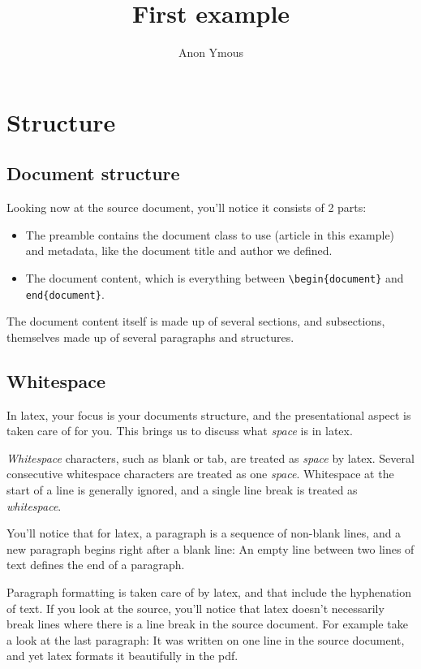 \documentclass{article}
\title{First example}
\author{Anon Ymous}
\begin{document}
\maketitle

\section{Structure}

\subsection{Document structure}

Looking now at the source document, you'll notice it consists of 2 parts:

\begin{itemize}
    \item The preamble contains the document class to use (article in this
    example) and metadata, like the document title and author we defined.
    \item The document content, which is everything between
    \verb`\begin{document}` and \verb`end{document}`.
\end{itemize}

The document content itself is made up of several sections, and subsections,
themselves made up of several paragraphs and structures.


\subsection{Whitespace}

In latex, your focus is your documents structure, and the presentational aspect
is taken care of for you. This brings us to discuss what \textit{space} is in
latex.

\textit{Whitespace} characters, such as blank or tab, are treated as
\textit{space} by latex.
Several consecutive whitespace characters are treated as one \textit{space}.
Whitespace at the start of a line is generally ignored, and a single line
break is treated as \textit{whitespace}.

You'll notice that for latex, a paragraph is a sequence of non-blank lines, and
a new paragraph begins right after a blank line: An empty line between two
lines of text defines the end of a paragraph.

Paragraph formatting is taken care of by latex, and that include the
hyphenation of text. If you look at the source, you'll notice that latex
doesn't necessarily break lines where there is a line break in the source
document. For example take a look at the last paragraph: It was written on one
line in the source document, and yet latex formats it beautifully in the pdf.
\end{document}
